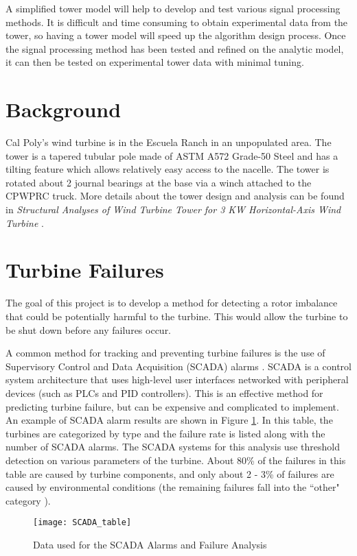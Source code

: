 A simplified tower model will help to develop and test various signal processing methods.  It is difficult and time consuming to obtain experimental data from the tower, so having a tower model will speed up the algorithm design process.  Once the signal processing method has been tested and refined on the analytic model, it can then be tested on experimental tower data with minimal tuning.

\section{Background}
Cal Poly’s wind turbine is in the Escuela Ranch in an unpopulated area.  The tower is a tapered tubular pole made of ASTM A572 Grade-50 Steel and has a tilting feature which allows relatively easy access to the nacelle.  The tower is rotated about 2 journal bearings at the base via a winch attached to the CPWPRC truck.  More details about the tower design and analysis can be found in \textit{Structural Analyses of Wind Turbine Tower for 3 KW Horizontal-Axis Wind Turbine} \cite{Gwon_paper}.

\section{Turbine Failures}
The goal of this project is to develop a method for detecting a rotor imbalance that could be potentially harmful to the turbine.  This would allow the turbine to be shut down before any failures occur.  

A common method for tracking and preventing turbine failures is the use of Supervisory Control and Data Acquisition (SCADA) alarms \cite{WT_failures_paper}.  SCADA is a control system architecture that uses high-level user interfaces networked with peripheral devices (such as PLCs and PID controllers).  This is an effective method for predicting turbine failure, but can be expensive and complicated to implement.  An example of SCADA alarm results are shown in Figure \ref{fig:SCADA_table}.  In this table, the turbines are categorized by type and the failure rate is listed along with the number of SCADA alarms.  The SCADA systems for this analysis use threshold detection on various parameters of the turbine.  About 80\% of the failures in this table are caused by turbine components, and only about 2 - 3\% of failures are caused by environmental conditions (the remaining failures fall into the ``other" category \cite{wind_turbine_failures}).

\begin{figure}
	\centering
	\texttt{[image: SCADA\_table]}
	\decoRule
	\caption{Data used for the SCADA Alarms and Failure Analysis \cite{wind_turbine_failures}}
	\label{fig:SCADA_table}
\end{figure}

